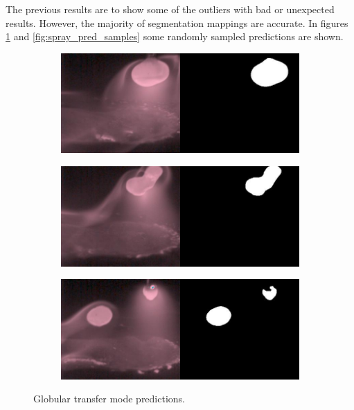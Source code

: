 The previous results are to show some of the outliers with bad or unexpected results. However, the majority of segmentation mappings are accurate. In figures \ref{fig:glob_pred_samples} and \ref{fig:spray_pred_samples} some randomly sampled predictions are shown.

\begin{figure}
\centering
  \begin{subfigure}[b]{0.45\textwidth}
    \includegraphics[width=\linewidth]{Images/Results/glob_pred_0.jpg}
    \caption{}

  \end{subfigure}
\hfill
  \begin{subfigure}[b]{0.45\textwidth}
    \includegraphics[width=\linewidth]{Images/Results/glob_pred_3870.jpg}
    \caption{}

  \end{subfigure}
  \begin{subfigure}[b]{0.45\textwidth}
    \includegraphics[width=\linewidth]{Images/Results/glob_pred_4817.jpg}
    \caption{}

  \end{subfigure}
    \caption[Globular transfer mode predictions]{Globular transfer mode predictions.}
    \label{fig:glob_pred_samples}
\end{figure}

